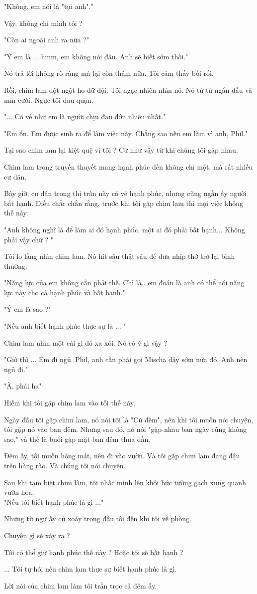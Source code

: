 "Không, em nói là "tụi anh"."

Vậy, không chỉ mình tôi ?

"Còn ai ngoài anh ra nữa ?"

"Ý em là ... hmm, em không nói đâu. Anh sẽ biết sớm thôi."

Nó trả lời không rõ ràng mà lại còn thâm nữa. Tôi cảm thấy bối rối.

Rồi, chim lam đột ngột ho dữ dội. Tôi ngạc nhiên nhìn nó. Nó từ từ ngẩn đầu và mỉn cười. Ngực tôi đau quặn.

"... Có vẻ như em là người chịu đau đớn nhiều nhất."

"Em ổn. Em được sinh ra để làm việc này. Chẳng sao nếu em làm vì anh, Phil."

Tại sao chim lam lại kiệt quệ vì tôi ? Cứ như vậy từ khi chúng tôi gặp nhau.

Chim lam trong truyền thuyết mang hạnh phúc đến không chỉ một, mà rất nhiều cư dân.

Bây giờ, cư dân trong thị trấn này có vẻ hạnh phúc, nhưng cũng ngần ấy người bất hạnh. Điều chắc chắn rằng, trước khi tôi gặp chim lam thì mọi việc không thế này.

"Anh không nghĩ là để làm ai đó hạnh phúc, một ai đó phải bất hạnh... Không phải vậy chứ ? "

Tôi lo lắng nhìn chim lam. Nó hít sâu thật sâu để đưa nhịp thở trở lại bình thường.

"Năng lực của em không cần phải thế. Chỉ là.. em đoán là anh có thể nói năng lực này cho cả hạnh phúc và bất hạnh."

"Ý em là sao ?"

"Nếu anh biết hạnh phúc thực sự là ... "

Chim lam nhìn một cái gì đó xa xôi. Nó có ý gì vậy ? 

"Giờ thì ... Em đi ngủ. Phil, anh cần phải gọi Mischa dậy sớm nữa đó. Anh nên ngủ đi."

"À, phải ha"

Hiếm khi tôi gặp chim lam vào tối thế này.

Ngày đầu tôi gặp chim lam, nó nói tôi là "Cú đêm", nên khi tôi muốn nói chuyện, tôi gặp nó vào ban đêm. Nhưng sau đó, nó nói "gặp nhau ban ngày cũng không sao," và thế là buổi gặp mặt ban đêm thưa dần. 

Đêm ấy, tôi muốn hóng mát, nên đi vào vườn. Và tôi gặp chim lam đang đậu trên hàng rào. Và chúng tôi nói chuyện.

Sau khi tạm biệt chim làm, tôi nhấc mình lên khỏi bức tường gạch xung quanh vườn hoa. \\

"Nếu tôi biết hạnh phúc là gì ..."

Những từ ngữ ấy cứ xoáy trong đầu tôi đến khi tôi về phòng.

Chuyện gì sẽ xảy ra ?

Tôi có thể giữ hạnh phúc thế này ? Hoặc tôi sẽ bất hạnh ?

... Tôi tự hỏi nếu chim lam thực sự biết hạnh phúc là gì.

Lời nói của chim lam làm tôi trằn trọc cả đêm ấy.
 


